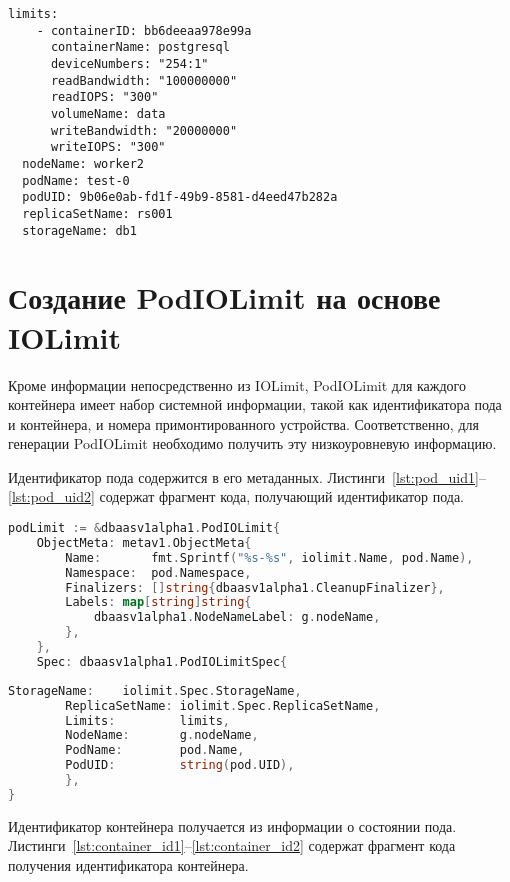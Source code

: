 \begin{lstlisting}[label=lst:podiolimit2, caption={Пример манифеста PodIOLimit (продолжение листинга~\ref{lst:podiolimit1})}]
  limits:
    - containerID: bb6deeaa978e99a
      containerName: postgresql
      deviceNumbers: "254:1"
      readBandwidth: "100000000"
      readIOPS: "300"
      volumeName: data
      writeBandwidth: "20000000"
      writeIOPS: "300"
  nodeName: worker2
  podName: test-0
  podUID: 9b06e0ab-fd1f-49b9-8581-d4eed47b282a
  replicaSetName: rs001
  storageName: db1
\end{lstlisting}

\section{Создание PodIOLimit на основе IOLimit}

Кроме информации непосредственно из IOLimit, PodIOLimit для каждого контейнера имеет набор системной информации, такой как идентификатора пода и контейнера, и номера примонтированного устройства. Соответственно, для генерации PodIOLimit необходимо получить эту низкоуровневую информацию.

Идентификатор пода содержится в его метаданных. Листинги~\ref{lst:pod_uid1}--\ref{lst:pod_uid2} содержат фрагмент кода, получающий идентификатор пода.

\begin{lstlisting}[language=Go,label=lst:pod_uid1, caption={Получение идентификатора пода}]
podLimit := &dbaasv1alpha1.PodIOLimit{
	ObjectMeta: metav1.ObjectMeta{
		Name:       fmt.Sprintf("%s-%s", iolimit.Name, pod.Name),
		Namespace:  pod.Namespace,
		Finalizers: []string{dbaasv1alpha1.CleanupFinalizer},
		Labels: map[string]string{
			dbaasv1alpha1.NodeNameLabel: g.nodeName,
		},
	},
	Spec: dbaasv1alpha1.PodIOLimitSpec{
\end{lstlisting}

\begin{lstlisting}[language=Go,label=lst:pod_uid2, caption={Получение идентификатора пода (продолжение листинга~\ref{lst:pod_uid1})}]
		StorageName:    iolimit.Spec.StorageName,
		ReplicaSetName: iolimit.Spec.ReplicaSetName,
		Limits:         limits,
		NodeName:       g.nodeName,
		PodName:        pod.Name,
		PodUID:         string(pod.UID),
		},
}
\end{lstlisting}

Идентификатор контейнера получается из информации о состоянии пода. Листинги~\ref{lst:container_id1}--\ref{lst:container_id2} содержат фрагмент кода получения идентификатора контейнера.

